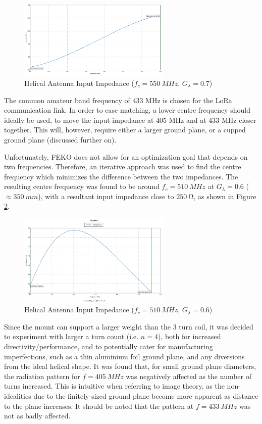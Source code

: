 \begin{figure}[!htb]
  \centering
  \includegraphics[width=0.65\textwidth]{helix3_impedance}
  \caption{Helical Antenna Input Impedance ($f_c = \SI{550}{MHz}$, $G_\lambda = 0.7$)}
  \label{fig:helix3_impedance}
\end{figure}

The common amateur band frequency of 433 MHz is chosen for the LoRa communication link. In order to ease matching, a lower centre frequency should ideally be used, to move the input impedance at 405 MHz and at 433 MHz closer together. This will, however, require either a larger ground plane, or a cupped ground plane (discussed further on).

Unfortunately, FEKO does not allow for an optimization goal that depends on two frequencies. Therefore, an iterative approach was used to find the centre frequency which minimizes the difference between the two impedances. The resulting centre frequency was found to be around $f_c = \SI{510}{MHz}$ at $G_\lambda = 0.6$ ($\approx \SI{350}{mm}$), with a resultant input impedance close to $\SI{250}{\ohm}$, as shown in Figure \ref{fig:helix4_impedance}.

\begin{figure}[!htb]
  \centering
  \includegraphics[width=0.65\textwidth]{helix4_impedance}
  \caption{Helical Antenna Input Impedance ($f_c = \SI{510}{MHz}$, $G_\lambda = 0.6$)}
  \label{fig:helix4_impedance}
\end{figure}

Since the mount can support a larger weight than the 3 turn coil, it was decided to experiment with larger a turn count (i.e. $n=4$), both for increased directivity/performance, and to potentially cater for manufacturing imperfections, such as a thin aluminium foil ground plane, and any diversions from the ideal helical shape. It was found that, for small ground plane diameters, the radiation pattern for $f = \SI{405}{MHz}$ was negatively affected as the number of turns increased. This is intuitive when referring to image theory, as the non-idealities due to the finitely-sized ground plane become more apparent as distance to the plane increases. It should be noted that the pattern at $f = \SI{433}{MHz}$ was not as badly affected.

